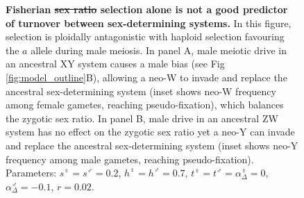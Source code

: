 \documentclass[10pt,letterpaper]{article}
\providecommand{\DIFaddtex}[1]{{\protect\color{blue}\uwave{#1}}} %
\providecommand{\DIFdeltex}[1]{{\protect\color{red}\sout{#1}}}                      %
\providecommand{\DIFaddFL}[1]{\DIFadd{#1}} %
\providecommand{\DIFdelFL}[1]{\DIFdel{#1}} %
\providecommand{\DIFaddbeginFL}{} %
\providecommand{\DIFaddendFL}{} %
\providecommand{\DIFdelbeginFL}{} %
\providecommand{\DIFdelendFL}{} %
\providecommand{\DIFadd}[1]{\texorpdfstring{\DIFaddtex{#1}}{#1}} %
\providecommand{\DIFdel}[1]{\texorpdfstring{\DIFdeltex{#1}}{}} %
\newcommand{\DIFscaledelfig}{0.5}
\newlength{\DIFdelgraphicswidth} %
\newlength{\DIFdelgraphicsheight} %
\newcommand{\DIFaddincludegraphics}[2][]{{\color{blue}\fbox{\DIFOincludegraphics[#1]{#2}}}} %
\newcommand{\DIFdelincludegraphics}[2][]{%
\sbox{\DIFdelgraphicsbox}{\DIFOincludegraphics[#1]{#2}}%
\settoboxwidth{\DIFdelgraphicswidth}{\DIFdelgraphicsbox} %
\settoboxtotalheight{\DIFdelgraphicsheight}{\DIFdelgraphicsbox} %
\scalebox{\DIFscaledelfig}{%
\parbox[b]{\DIFdelgraphicswidth}{\usebox{\DIFdelgraphicsbox}\\[-\baselineskip] \rule{\DIFdelgraphicswidth}{0em}}\llap{\resizebox{\DIFdelgraphicswidth}{\DIFdelgraphicsheight}{%
\setlength{\unitlength}{\DIFdelgraphicswidth}%
\begin{picture}(1,1)%
\thicklines\linethickness{2pt} %
{\color[rgb]{1,0,0}\put(0,0){\framebox(1,1){}}}%
{\color[rgb]{1,0,0}\put(0,0){\line( 1,1){1}}}%
{\color[rgb]{1,0,0}\put(0,1){\line(1,-1){1}}}%
\end{picture}%
}\hspace*{3pt}}} %
} %
\DeclareRobustCommand{\DIFaddbeginFL}{\DIFOaddbeginFL \let\includegraphics\DIFaddincludegraphics} %
\DeclareRobustCommand{\DIFaddendFL}{\DIFOaddendFL \let\includegraphics\DIFOincludegraphics} %
\DeclareRobustCommand{\DIFdelbeginFL}{\DIFOdelbeginFL \let\includegraphics\DIFdelincludegraphics} %
\DeclareRobustCommand{\DIFdelendFL}{\DIFOaddendFL \let\includegraphics\DIFOincludegraphics} %
\begin{document}
\begin{figure}[!h]
\centering
\caption{
{\bf Fisherian \DIFdelbeginFL \DIFdelFL{sex ratio }\DIFdelendFL \DIFaddbeginFL \DIFaddFL{sex-ratio }\DIFaddendFL selection alone is not a good predictor of turnover between sex-determining systems.}
In this figure, selection is ploidally antagonistic with haploid selection favouring the $a$ allele during male meiosis.
In panel A, male meiotic drive in an ancestral XY system causes a male bias (see Fig \ref{fig:model_outline}B), allowing a neo-W to invade and replace the ancestral sex-determining system (inset shows neo-W frequency among female gametes, reaching pseudo-fixation), which balances the zygotic sex ratio.
In panel B, male drive in an ancestral ZW system has no effect on the zygotic sex ratio yet a neo-Y can invade and replace the ancestral sex-determining system (inset shows neo-Y frequency among male gametes, reaching pseudo-fixation). 
Parameters:  $s^\female =s^\male = 0.2$, $h^\female = h^\male = 0.7$, $t^\female = t^\male = \alpha^\female_\Delta = 0$, $\alpha^\male_\Delta = -0.1$, $r=0.02$.
}
\label{fig:SexRatioBad}
\end{figure}
\end{document}
